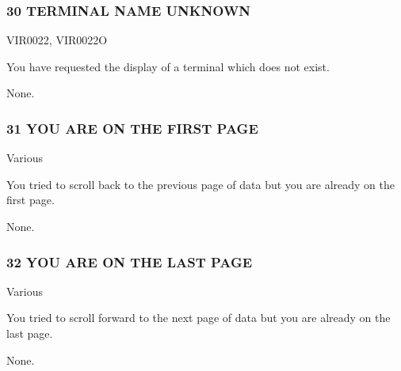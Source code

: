 \documentclass[letterpaper,10pt,english]{sphinxmanual}
\begin{document}
\subsubsection{30 TERMINAL NAME UNKNOWN}
\label{\detokenize{messages:terminal-name-unknown}}\begin{description}
\sphinxAtStartPar
VIR0022, VIR0022O

\sphinxAtStartPar
You have requested the display of a terminal which does not exist.

\sphinxAtStartPar
None.

\end{description}


\subsubsection{31 YOU ARE ON THE FIRST PAGE}
\label{\detokenize{messages:you-are-on-the-first-page}}\begin{description}
\sphinxAtStartPar
Various

\sphinxAtStartPar
You tried to scroll back to the previous page of data but you are already on the first page.

\sphinxAtStartPar
None.

\end{description}


\subsubsection{32 YOU ARE ON THE LAST PAGE}
\label{\detokenize{messages:you-are-on-the-last-page}}\begin{description}
\sphinxAtStartPar
Various

\sphinxAtStartPar
You tried to scroll forward to the next page of data but you are already on the last page.

\sphinxAtStartPar
None.

\end{description}
\end{document}
